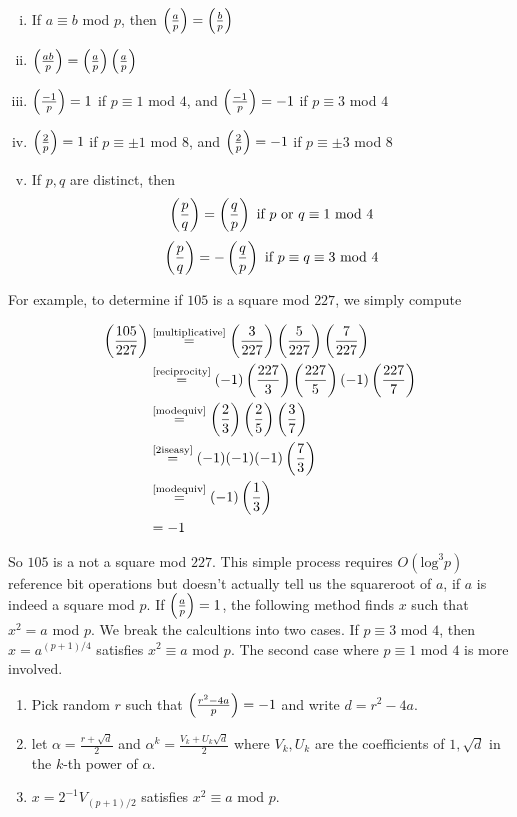 \begin{enumerate}[(i)]
	\item \label{modequiv} If $a \equiv b$ mod $p$, then $\left(\frac{a}{p}\right) = \left(\frac{b}{p}\right)$
	\item \label{multiplicative} $\left(\frac{ab}{p}\right) = \left(\frac{a}{p}\right) \left(\frac{a}{p}\right) $
	\item \label{1iseasy} $\left(\frac{-1}{p}\right) = 1$ if $p \equiv 1 $ mod $4$, and $\left(\frac{-1}{p}\right) = -1$ if $p \equiv 3 $ mod $4$
	\item \label{2iseasy} $\left(\frac{2}{p}\right) = 1$ if $p \equiv \pm 1 $ mod $8$, and $\left(\frac{2}{p}\right) = -1$ if $p \equiv \pm 3 $ mod $8$
	\item \label{reciprocity} If $p,q$ are distinct, then 
		$$ 
			\left(\frac{p}{q}\right) = \left(\frac{q}{p}\right) \text { if } p \text { or } q \equiv 1 \text{ mod } 4
		$$ 
		$$  
			\left(\frac{p}{q}\right) = - \left(\frac{q}{p}\right) \text { if } p \equiv q \equiv 3 \text{ mod } 4
		$$
\end{enumerate}

For example, to determine if $105$ is a square mod $227$, we simply compute 

\begin{align*}
	\left(\frac{105}{227}\right) &\stackrel{\text{\eqref{multiplicative}}}{=} \left(\frac{3}{227}\right)\left(\frac{5}{227}\right)\left(\frac{7}{227}\right) \\
	&\stackrel{\text{\eqref{reciprocity}}}{=} (-1) \left(\frac{227}{3}\right)\left(\frac{227}{5}\right) (-1) \left(\frac{227}{7}\right) \\
	&\stackrel{\text{\eqref{modequiv}}}{=} \left(\frac{2}{3}\right)\left(\frac{2}{5}\right)\left(\frac{3}{7}\right) \\
	&\stackrel{\text{\eqref{2iseasy}}}{=} (-1)(-1)(-1) \left(\frac{7}{3}\right) \\
	&\stackrel{\text{\eqref{modequiv}}}{=} (-1) \left(\frac{1}{3}\right) \\
	&= -1 
\end{align*}

So $105$ is a not a square mod $227$. This simple process requires $O(\text{log}^3p)$ {\color{red}  reference } bit operations but doesn't actually tell us the squareroot of $a$, if $a$ is indeed a square mod $p$. If $\left(\frac{a}{p}\right) = 1 $, the following method finds $x$ such that $x^2 = a$ mod $p$. We break the calcultions into two cases. If $p \equiv 3 $ mod $4$, then $x = a^{(p+1)/4}$ satisfies $x^2 \equiv a $ mod $p$. The second case where $p \equiv 1 $ mod $4$ is more involved.

\begin{enumerate}[1.]
	\item Pick random $r$ such that $\left(\frac{r^2 - 4a}{p}\right) =  -1 $ and write $d = r^2 - 4a$.
	\item let $\alpha = \frac{r+\sqrt{d}}{2}$ and $\alpha^k = \frac{V_k + U_k \sqrt{d}}{2}$ where $V_k,U_k$ are the coefficients of $1, \sqrt{d}$ in the $k$-th power of $\alpha$. 
	\item $x =  2^{-1}V_{(p+1)/2}$ satisfies $x^2 \equiv a $ mod $p$. 
\end{enumerate}

